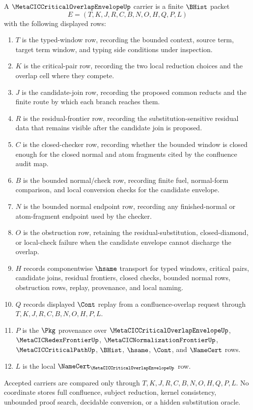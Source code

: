 \begin{definition}
\label{def:metacic-critical-overlap-envelope-carrier}
A $\MetaCICCriticalOverlapEnvelopeUp$ carrier is a finite $\BHist$ packet
$$
E=(T,K,J,R,C,B,N,O,H,Q,P,L)
$$
with the following displayed rows:
\begin{enumerate}
\item $T$ is the typed-window row, recording the bounded context, source term, target term window, and typing side conditions under inspection.
\item $K$ is the critical-pair row, recording the two local reduction choices and the overlap cell where they compete.
\item $J$ is the candidate-join row, recording the proposed common reducts and the finite route by which each branch reaches them.
\item $R$ is the residual-frontier row, recording the substitution-sensitive residual data that remains visible after the candidate join is proposed.
\item $C$ is the closed-checker row, recording whether the bounded window is closed enough for the closed normal and atom fragments cited by the confluence audit map.
\item $B$ is the bounded normal/check row, recording finite fuel, normal-form comparison, and local conversion checks for the candidate envelope.
\item $N$ is the bounded normal endpoint row, recording any finished-normal or atom-fragment endpoint used by the checker.
\item $O$ is the obstruction row, retaining the residual-substitution, closed-diamond, or local-check failure when the candidate envelope cannot discharge the overlap.
\item $H$ records componentwise $\hsame$ transport for typed windows, critical pairs, candidate joins, residual frontiers, closed checks, bounded normal rows, obstruction rows, replay, provenance, and local naming.
\item $Q$ records displayed $\Cont$ replay from a confluence-overlap request through $T,K,J,R,C,B,N,O,H,P,L$.
\item $P$ is the $\Pkg$ provenance over $\MetaCICCriticalOverlapEnvelopeUp$, $\MetaCICRedexFrontierUp$, $\MetaCICNormalizationFrontierUp$, $\MetaCICCriticalPathUp$, $\BHist$, $\hsame$, $\Cont$, and $\NameCert$ rows.
\item $L$ is the local $\NameCert_{\MetaCICCriticalOverlapEnvelopeUp}$ row.
\end{enumerate}
Accepted carriers are compared only through $T,K,J,R,C,B,N,O,H,Q,P,L$. No coordinate stores full confluence, subject reduction, kernel consistency, unbounded proof search, decidable conversion, or a hidden substitution oracle.
\end{definition}

